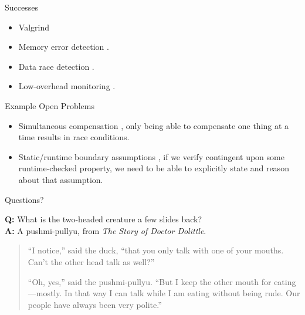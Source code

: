 \documentclass[12pt]{beamer}
\begin{document}
\begin{frame}{Successes}

  \begin{itemize}
    \item Valgrind \parencite{valgrind}
    \item Memory error detection \parencite{addrsan}.
    \item Data race detection \parencite{datarace}.
    \item Low-overhead monitoring \parencite{compensate}.
  \end{itemize}
\end{frame}

\begin{frame}{Example Open Problems}
  \begin{itemize}
    \item Simultaneous compensation \parencite{compensate}, only being
      able to compensate one thing at a time results in race
      conditions.

    \item Static/runtime boundary assumptions \parencite{explicit}, if
      we verify contingent upon some runtime-checked property, we need
      to be able to explicitly state and reason about that assumption.
  \end{itemize}
\end{frame}

\begin{frame}{Questions?}
  \vspace{4.5cm}

  \footnotesize
  \textbf{Q:} What is the two-headed creature a few slides back?\\
  \textbf{A:} A pushmi-pullyu, from \textit{The Story of Doctor Dolittle}.

  \begin{quote}
    ``I notice,'' said the duck, ``that you only talk with one of your
    mouths. Can't the other head talk as well?''

    ``Oh, yes,'' said the pushmi-pullyu. ``But I keep the other mouth
    for eating---mostly. In that way I can talk while I am eating
    without being rude. Our people have always been very polite.''
  \end{quote}
\end{frame}
\end{document}
